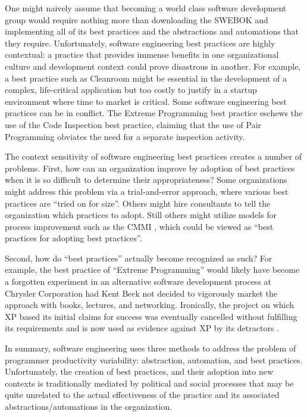 One might naively assume that becoming a world class software development
group would require nothing more than downloading the SWEBOK and
implementing all of its best practices and the abstractions and automations
that they require.  Unfortunately, software engineering best practices are
highly contextual: a practice that provides immense benefits in one
organizational culture and development context could prove disastrous in
another. For example, a best practice such as Cleanroom might be essential
in the development of a complex, life-critical application but too costly
to justify in a startup environment where time to market is critical.  Some
software engineering best practices can be in conflict.  The Extreme
Programming \cite{Beck00} best practice eschews the use of the Code
Inspection \cite{Fagan76} best practice, claiming that the use of Pair
Programming obviates the need for a separate inspection activity.

The context sensitivity of software engineering best practices creates a
number of problems. First, how can an organization improve by adoption of
best practices when it is so difficult to determine their appropriateness?
Some organizations might address this problem via a trial-and-error
approach, where various best practices are ``tried on for size''.  Others
might hire consultants to tell the organization which practices to
adopt. Still others might utilize models for process improvement such as
the CMMI \cite{Royce02}, which could be viewed as ``best practices for
adopting best practices''.

Second, how do ``best practices'' actually become recognized as such?  For
example, the best practice of ``Extreme Programming'' would likely have
become a forgotten experiment in an alternative software development
process at Chrysler Corporation had Kent Beck not decided to vigorously
market the approach with books, lectures, and networking.  Ironically, the
project on which XP based its initial claims for success was eventually
cancelled without fulfilling its requirements and is now used as evidence
against XP by its detractors \cite{Keefer03}.

In summary, software engineering uses three methods to address the problem
of programmer productivity variability: abstraction, automation, and best
practices.  Unfortunately, the creation of best practices, and their
adoption into new contexts is traditionally mediated by political and
social processes that may be quite unrelated to the actual effectiveness of
the practice and its associated abstractions/automations in the 
organization.



